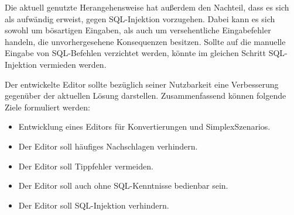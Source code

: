 Die aktuell genutzte Herangehensweise hat außerdem den Nachteil, dass es sich als aufwändig erweist, gegen \ac{SQL}-Injektion vorzugehen. Dabei kann es sich sowohl um bösartigen Eingaben, als auch um versehentliche Eingabefehler handeln, die unvorhergesehene Konsequenzen besitzen. Sollte auf die manuelle Eingabe von \ac{SQL}-Befehlen verzichtet werden, könnte im gleichen Schritt \ac{SQL}-Injektion vermieden werden.

\pskip
Der entwickelte Editor sollte bezüglich seiner Nutzbarkeit eine Verbesserung gegenüber der aktuellen Lösung darstellen. Zusammenfassend können folgende Ziele formuliert werden:
\begin{itemize}
  \item Entwicklung eines Editors für Konvertierungen und SimplexSzenarios.
  \item Der Editor soll häufiges Nachschlagen verhindern.
  \item Der Editor soll Tippfehler vermeiden.
  \item Der Editor soll auch ohne \ac{SQL}-Kenntnisse bedienbar sein.
  \item Der Editor soll \ac{SQL}-Injektion verhindern.
\end{itemize}
